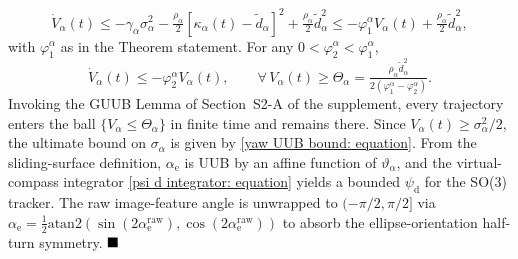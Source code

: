 {\begin{equation}
\dot{V}_\alpha(t) \le -\gamma_\alpha\sigma_\alpha^2 - \tfrac{\rho_\alpha}{2}[\kappa_\alpha(t)-\tilde{d}_\alpha]^2 + \tfrac{\rho_\alpha}{2}\tilde{d}_\alpha^2 \le -\varphi_1^\alpha V_\alpha(t) + \tfrac{\rho_\alpha}{2}\tilde{d}_\alpha^2,
\end{equation}
with $\varphi_1^\alpha$ as in the Theorem statement. For any $0<\varphi_2^\alpha<\varphi_1^\alpha$,
\begin{equation*}
\dot{V}_\alpha(t)\le -\varphi_2^\alpha V_\alpha(t),\qquad \forall\,V_\alpha(t)\ge\Theta_\alpha = \tfrac{\rho_\alpha\tilde{d}_\alpha^2}{2(\varphi_1^\alpha-\varphi_2^\alpha)}.
\end{equation*}
Invoking the GUUB Lemma of Section~S2-A of the supplement, every trajectory enters the ball $\{V_\alpha\le\Theta_\alpha\}$ in finite time and remains there. Since $V_\alpha(t)\ge\sigma_\alpha^2/2$, the ultimate bound on $\sigma_\alpha$ is given by \eqref{yaw UUB bound: equation}. From the sliding-surface definition, $\alpha_\text{e}$ is UUB by an affine function of $\vartheta_\alpha$, and the virtual-compass integrator \eqref{psi d integrator: equation} yields a bounded $\psi_\text{d}$ for the SO(3) tracker. The raw image-feature angle is unwrapped to $(-\pi/2,\pi/2]$ via $\alpha_\text{e} = \tfrac12\text{atan2}(\sin(2\alpha_\text{e}^\text{raw}),\cos(2\alpha_\text{e}^\text{raw}))$ to absorb the ellipse-orientation half-turn symmetry. $\hfill\blacksquare$}

